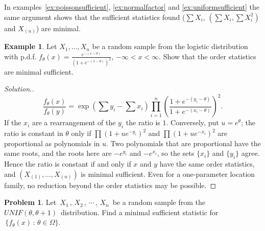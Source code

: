 \documentclass[12pt,a4paper]{report}
\theoremstyle{definition}
\newtheorem{exa}[thm]{Example}
\newtheorem{problemx}{Problem}[section]
\newenvironment{problem}{\begin{problemx}}{\end{problemx}}
\newenvironment{solution}
  {\renewcommand{\qedsymbol}{}\begin{proof}[\textit{Solution}.]}
  {\end{proof}}
\begin{document}
In examples~\ref{ex:poissonsufficient}, \ref{ex:normalfactor} and
\ref{ex:uniformsufficient} the same argument shows that the sufficient statistics
found ($\sum X_i$, $\left(\sum X_i, \sum X_i^2\right)$ and $X_{(n)}$) are minimal.

\begin{exa}
\label{ex:logisticminimal}
Let $X_1, \dots, X_n$ be a random sample from the logistic distribution with
p.d.f. $f_\theta(x) = \frac{e^{-(x - \theta)}}{\left(1 + e^{-(x - \theta)}\right)^2}$,
$-\infty<x<\infty$. Show that the order statistics are minimal sufficient.
\end{exa}

\begin{solution}
\[\frac{f_\theta(x)}{f_\theta(y)} = \exp\left(\sum y_i - \sum x_i\right)
\prod_{i=1}^n\left(\frac{1 + e^{-(y_i - \theta)}}{1 + e^{-(x_i - \theta)}}\right)^2 .\]
If the $x_i$ are a rearrangement of the $y_i$ the ratio is $1$. Conversely, put
$u = e^\theta$; the ratio is constant in $\theta$ only if
$\prod (1 + u e^{-y_i})^2$ and $\prod (1 + u e^{-x_i})^2$ are proportional as
polynomials in $u$. Two polynomials that are proportional have the same roots, and
the roots here are $-e^{y_i}$ and $-e^{x_i}$, so the sets $\{x_i\}$ and $\{y_i\}$
agree. Hence the ratio is constant if and only if $x$ and $y$ have the same order
statistics, and $(X_{(1)}, \dots, X_{(n)})$ is minimal sufficient. Even for a
one-parameter location family, no reduction beyond the order statistics may be
possible.
\end{solution}

\begin{problem}
Let $\, X_1\, , \, X_2\, , \, \cdots \, , \, X_n\,$ be a random sample from the $UNIF(\theta, \theta + 1)\,$ distribution. Find  a minimal sufficient statistic for $\, \{f_{\theta}(x)\, :\, \theta \in \Omega\}$.
\end{problem}
\end{document}
